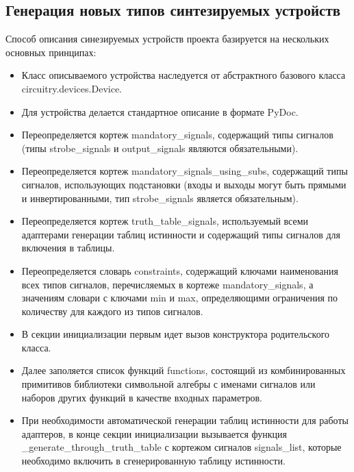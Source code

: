 \documentclass[document.tex]{subfiles}
\begin{document}
\clearpage\subsection{Генерация новых типов синтезируемых устройств}
Способ описания синезируемых устройств проекта базируется на нескольких
основных принципах:
\begin{itemize}[noitemsep]
  \item Класс описываемого устройства наследуется от абстрактного базового
  класса circuitry.devices.Device.
  \item Для устройства делается стандартное описание в формате PyDoc.
  \item Переопределяется кортеж mandatory{\_}signals, содержащий типы сигналов
  (типы strobe{\_}signals и output{\_}signals являются обязательными).
  \item Переопределяется кортеж mandatory{\_}signals{\_}using{\_}subs,
  содержащий типы сигналов, использующих подстановки (входы и выходы могут быть прямыми и
  инвертированными, тип strobe{\_}signals является обязательным).
  \item Переопределяется кортеж truth{\_}table{\_}signals, используемый всеми
  адаптерами генерации таблиц истинности и содержащий типы сигналов для
  включения в таблицы.
  \item Переопределяется словарь constraints, содержащий ключами наименования
  всех типов сигналов, перечисляемых в кортеже mandatory{\_}signals, а значениям
  словари с ключами min и max, определяющими ограничения по количеству для
  каждого из типов сигналов.
  \item В секции инициализации первым идет вызов конструктора родительского
  класса.
  \item Далее заполяется список функций functions, состоящий из комбинированных
  примитивов библиотеки символьной алгебры с именами сигналов или наборов
  других функций в качестве входных параметров.
  \item При необходимости автоматической генерации таблиц истинности для работы
  адаптеров, в конце секции инициализации вызывается функция
  {\_}generate{\_}through{\_}truth{\_}table с кортежом сигналов signals{\_}list,
  которые необходимо включить в сгенерированную таблицу истинности.
\end{itemize}
\end{document}
